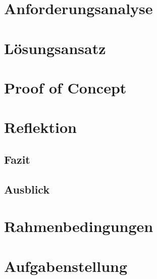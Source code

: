 \documentclass[
11pt, %
a4paper, %
BCOR10mm, %
DIV14, %
footsepline = false, %
headsepline, %
oneside, %
openright,
halfparskip, %
abstracton, %
listof=totocnumbered, %
bibliography=totocnumbered %
]{scrreprt}
\begin{document}
  \chapter{Anforderungsanalyse}\label{chap:anforderungen}
  
  
  \chapter{Lösungsansatz}\label{chap:loesungsansatz}
  
  
  \chapter{Proof of Concept}\label{chap:proof_of_concept}
  
  
  \chapter{Reflektion}\label{chap:reflektion}
  \section{Fazit}
  \section{Ausblick}
  
  \appendix
  
  \chapter{Rahmenbedingungen}
  
  
  \chapter{Aufgabenstellung}\label{chap:aufgabenstellung}
  
  
  
  
  
  \listoffigures
  \listoftables
  
  
  
\end{document}
